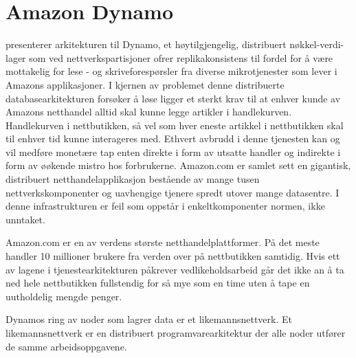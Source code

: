 \section{Amazon Dynamo}

\cite{decandia2007} presenterer arkitekturen til Dynamo, et høytilgjengelig, distribuert nøkkel-verdi-lager som ved nettverkspartisjoner ofrer replikakonsistens til fordel for å være mottakelig for lese - og skriveforespørsler fra diverse mikrotjenester som lever i Amazons applikasjoner. I kjernen av problemet denne distribuerte databasearkitekturen forsøker å løse ligger et sterkt krav til at enhver kunde av Amazons netthandel alltid skal kunne legge artikler i handlekurven. Handlekurven i nettbutikken, så vel som hver eneste artikkel i nettbutikken skal til enhver tid kunne interageres med. Ethvert avbrudd i denne tjenesten kan og vil medføre monetære tap enten direkte i form av utsatte handler og indirekte i form av øøkende mistro hos forbrukerne. Amazon.com er samlet sett en gigantisk, distribuert netthandelapplikasjon bestående av mange tusen nettverkskomponenter og uavhengige tjenere spredt utover mange datasentre. I denne infrastrukturen er feil som oppstår i enkeltkomponenter normen, ikke unntaket.

Amazon.com er en av verdens største netthandelplattformer. På det meste handler 10 millioner brukere fra verden over på nettbutikken samtidig. Hvis ett av lagene i tjenestearkitekturen påkrever vedlikeholdsarbeid går det ikke an å ta ned hele nettbutikken fullstendig for så mye som en time uten å tape en uutholdelig mengde penger.


Dynamos ring av noder som lagrer data er et likemannsnettverk. Et likemannsnettverk er en distribuert programvarearkitektur der alle noder utfører de samme arbeidsoppgavene.

